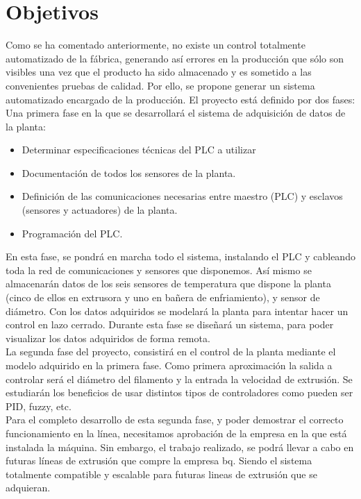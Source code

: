 \chapter{Objetivos}
\label{objetivos}

Como se ha comentado anteriormente, no existe un control totalmente automatizado de la fábrica, generando así errores en la producción que sólo son visibles una vez que el producto ha sido almacenado y es sometido a las convenientes pruebas de calidad. Por ello, se propone generar un sistema automatizado encargado de la producción. El proyecto está definido por dos fases:\\

Una primera fase en la que se desarrollará el sistema de adquisición de datos de la planta:
\begin{itemize}
    \item Determinar especificaciones técnicas del PLC a utilizar
    \item Documentación de todos los sensores de la planta.
    \item Definición de las comunicaciones necesarias entre maestro (PLC) y esclavos (sensores y actuadores) de la planta.
    \item Programación del PLC.
\end{itemize}
En esta fase, se pondrá en marcha todo el sistema, instalando el PLC y cableando toda la red de comunicaciones y sensores que disponemos. Así mismo se almacenarán datos de los seis sensores de temperatura que dispone la planta (cinco de ellos en extrusora y uno en bañera de enfriamiento), y sensor de diámetro. Con los datos adquiridos se modelará la planta para intentar hacer un control en lazo cerrado. Durante esta fase se diseñará un sistema, para poder visualizar los datos adquiridos de forma remota.\\

La segunda fase del proyecto, consistirá en el control de la planta mediante el modelo adquirido en la primera fase. Como primera aproximación la salida a controlar será el diámetro del filamento y la entrada la velocidad de extrusión. Se estudiarán los beneficios de usar distintos tipos de controladores como pueden ser PID, fuzzy, etc.\\

Para el completo desarrollo de esta segunda fase, y poder demostrar el correcto funcionamiento en la línea, necesitamos aprobación de la empresa en la que está instalada la máquina. Sin embargo, el trabajo realizado, se podrá llevar a cabo en futuras líneas de extrusión que compre la empresa bq. Siendo el sistema totalmente compatible y escalable para futuras lineas de extrusión que se adquieran.\\






